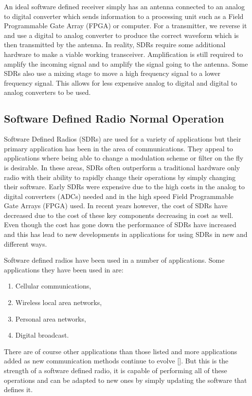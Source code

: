 An ideal software defined receiver simply has an antenna connected to an analog to digital converter which sends information to a processing unit such as a Field Programmable Gate Array (FPGA) or computer.  For a transmitter, we reverse it and use a digital to analog converter to produce the correct waveform which is then transmitted by the antenna.  In reality, SDRs require some additional hardware to make a viable working transceiver.  Amplification is still required to amplify the incoming signal and to amplify the signal going to the antenna.  Some SDRs also use a mixing stage to move a high frequency signal to a lower frequency signal.  This allows for less expensive analog to digital and digital to analog converters to be used.  

\subsection{Software Defined Radio Normal Operation}
Software Defined Radios (SDRs) are used for a variety of applications but their primary application has been in the area of communications.  They appeal to applications where being able to change a modulation scheme or filter on the fly is desirable.  In these areas, SDRs often outperform a traditional hardware only radio with their ability to rapidly change their operations by simply changing their software.  Early SDRs were expensive due to the high costs in the analog to digital converters (ADCs) needed and in the high speed Field Programmable Gate Arrays (FPGA) used.  In recent years however, the cost of SDRs have decreased due to the cost of these key components decreasing in cost as well.  Even though the cost has gone down the performance of SDRs have increased and this has lead to new developments in applications for using SDRs in new and different ways.

Software defined radios have been used in a number of applications.  Some applications they have been used in are:

\begin{enumerate}
\item Cellular communications,
\item Wireless local area networks,
\item Personal area networks,
\item Digital broadcast.
\end{enumerate}

There are of course other applications than those listed and more applications added as new communication methods continue to evolve [\cite{jondral2005software}].  But this is the strength of a software defined radio, it is capable of performing all of these operations and can be adapted to new ones by simply updating the software that defines it.

